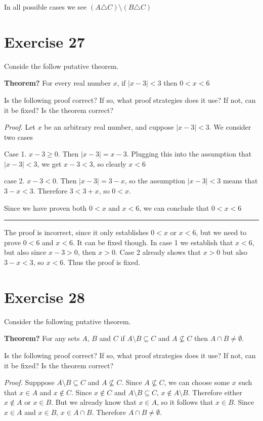 \documentclass[11pt]{article}
\begin{document}
In all possible cases we see $(A \triangle C) \setminus (B \triangle C)$

\section*{Exercise 27}

Conside the follow putative theorem.

\textbf{Theorem?} For every real number $x$, if $| x - 3 | < 3$ then $0 < x < 6$

Is the following proof correct? If so, what proof strategies does it use? If not, 
can it be fixed? Is the theorem correct?

\textit{Proof.} Let $x$ be an arbitrary real number, and cuppose $| x - 3 | < 3$.
We consider two cases

Case 1. $x - 3 \geq 0$. Then $| x - 3 | = x - 3$. Plugging this into the 
assumption that $| x - 3 | < 3$, we get $x - 3 < 3$, so clearly $x < 6$

case 2. $x - 3 < 0$. Then $| x - 3 | = 3 - x$, so the assumption $| x - 3 | < 3$
means that $3 - x < 3$. Therefore $3 < 3 + x$, so $0 < x$.

Since we have proven both $0 < x$ and $x < 6$, we can conclude that $0 < x < 6$

\par\noindent\rule{\textwidth}{0.4pt}

The proof is incorrect, since it only establishes $0 < x$ or $x < 6$, but we 
need to prove $0 < 6$ and $x < 6$. It can be fixed though. In case 1 we 
establish that $x < 6$, but also since $x - 3 > 0$, then $x > 0$. Case 2
already shows that $x > 0$ but also $3 - x < 3$, so $x < 6$. Thus the proof is 
fixed.

\section*{Exercise 28}

Consider the following putative theorem.

\textbf{Theorem?} For any sets $A$, $B$ and $C$ if $A \setminus B \subseteq C$
and $A \nsubseteq C$ then $A \cap B \neq \emptyset$.

Is the following proof correct? If so, what proof strategies does it use? If not, 
can it be fixed? Is the theorem correct?

\textit{Proof.} Supppose $A \setminus B \subseteq C$ and $A \nsubseteq C$. 
Since $A \nsubseteq C$, we can choose some $x$ such that $x \in A$ and $x \notin C$.
Since $x \notin C$ and $A \setminus B \subseteq C$, $x \notin A \setminus B$.
Therefore either $x \notin A$ or $x \in B$. But we already know that $x \in A$,
so it follows that $x \in B$. Since $x \in A$ and $x \in B$, $x \in A \cap B$.
Therefore $A \cap B \neq \emptyset$.
\end{document}
